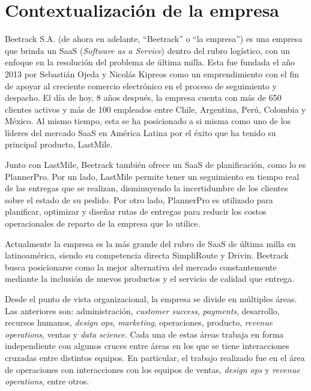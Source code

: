 \section{Contextualización de la empresa}
    
    Beetrack S.A. (de ahora en adelante, ``Beetrack'' o ``la empresa'') es una empresa que brinda un SaaS (\textit{Software as a Service}) dentro del rubro logístico, con un enfoque en la resolución del problema de última milla. Esta fue fundada el año 2013 por Sebastián Ojeda y Nicolás Kipreos como un emprendimiento con el fin de apoyar al creciente comercio electrónico en el proceso de seguimiento y despacho. El día de hoy, 8 años después, la empresa cuenta con más de 650 clientes activos y más de 100 empleados \cite{corporateit} entre Chile, Argentina, Perú, Colombia y México. Al mismo tiempo, esta se ha posicionado a si misma como uno de los líderes del mercado SaaS en América Latina por el éxito que ha tenido su principal producto, LastMile.

    Junto con LastMile, Beetrack también ofrece un SaaS de planificación, como lo es PlannerPro. Por un lado, LastMile permite tener un seguimiento en tiempo real de las entregas que se realizan, disminuyendo la incertidumbre de los clientes sobre el estado de su pedido. Por otro lado, PlannerPro es utilizado para planificar, optimizar y diseñar rutas de entregas para reducir los costos operacionales de reparto de la empresa que lo utilice.
    
    Actualmente la empresa es la más grande del rubro de SaaS de última milla en latinoamérica, siendo su competencia directa SimpliRoute y Drivin. Beetrack busca posicionarse como la mejor alternativa del mercado constantemente mediante la inclusión de nuevos productos y el servicio de calidad que entrega.
    
    Desde el punto de vista organizacional, la empresa se divide en múltiples áreas. Las anteriores son: administración, \textit{customer success}, \textit{payments}, desarrollo, recursos humanos, \textit{design ops}, \textit{marketing}, operaciones, producto, \textit{revenue operations}, ventas y \textit{data science}. Cada una de estas áreas trabaja en forma independiente con algunos cruces entre áreas en los que se tiene interacciones cruzadas entre distintos equipos. En particular, el trabajo realizado fue en el área de operaciones con interacciones con los equipos de ventas, \textit{design ops} y \textit{revenue operations}, entre otros.

